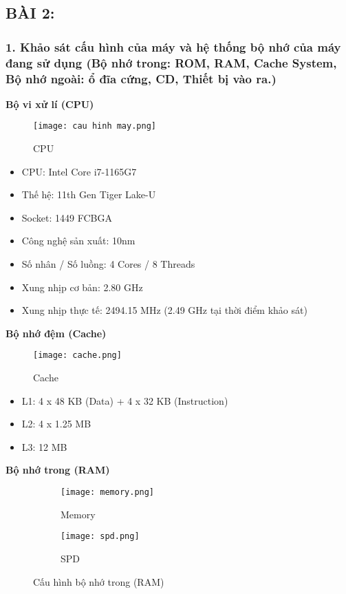\subsection*{\textbf{\Large BÀI 2: }}

\subsubsection*{1. Khảo sát cấu hình của máy và hệ thống bộ nhớ của máy đang sử dụng (Bộ nhớ trong: ROM, RAM, Cache System, Bộ nhớ ngoài: ổ đĩa
cứng, CD, Thiết bị vào ra.)}


\textbf{Bộ vi xử lí (CPU)}
\begin{figure}[H]
    \centering
    \texttt{[image: cau hinh may.png]}
    \caption{CPU}
    \label{fig:cau_hinh_may}
\end{figure}

\begin{itemize}
    \item CPU: Intel Core i7-1165G7
    \item Thế hệ: 11th Gen Tiger Lake-U
    \item Socket: 1449 FCBGA
    \item Công nghệ sản xuất: 10nm
    \item Số nhân / Số luồng: 4 Cores / 8 Threads
    \item Xung nhịp cơ bản: 2.80 GHz
    \item Xung nhịp thực tế: 2494.15 MHz (2.49 GHz tại thời điểm khảo sát)  
\end{itemize}
\textbf{Bộ nhớ đệm (Cache)}
\begin{figure}[H]
    \centering
    \texttt{[image: cache.png]}
    \caption{Cache}
    \label{fig:cache}
\end{figure}

\begin{itemize}
    \item L1: 4 x 48 KB (Data) + 4 x 32 KB (Instruction)
    \item L2: 4 x 1.25 MB
    \item L3: 12 MB
\end{itemize}
\textbf{Bộ nhớ trong (RAM)}
\begin{figure}[H]
    \centering
    \begin{subfigure}[h]{0.45\textwidth}
        \centering
        \texttt{[image: memory.png]}
        \caption{Memory}
        \label{fig:computer_memory}
    \end{subfigure}
    \begin{subfigure}[h]{0.45\textwidth}
        \centering
        \texttt{[image: spd.png]}
        \caption{SPD}
        \label{fig:computer_spd}
    \end{subfigure}
    \caption{Cấu hình bộ nhớ trong (RAM)}
    \label{fig:memory}
\end{figure}

